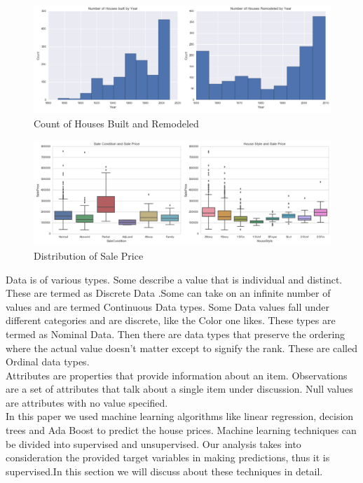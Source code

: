 \documentclass[fleqn,10pt]{SelfArx} %
\begin{document}
	\begin{figure}[ht]\centering %
		\includegraphics[width=\linewidth]{year}
		\caption{Count of Houses Built and Remodeled}
		\label{fig:year}
	\end{figure}
	\begin{figure}[ht]\centering %
		\includegraphics[width=\linewidth]{SalePrice}
		\caption{Distribution of Sale Price}
		\label{fig:SalePrice}
	\end{figure}

	Data is of various types. Some describe a value that is individual and distinct. These are termed as Discrete Data .Some can take on an infinite number of values and are termed Continuous Data types.  Some Data values fall under different categories and are discrete, like the Color one likes. These types are termed as Nominal Data. Then there are data types that preserve the ordering where the actual value doesn't matter except to signify the rank. These are called Ordinal data types. \\
	
	Attributes are properties that provide information about an item. Observations are a set of attributes that talk about a single item under discussion. Null values are attributes with no value specified.\\
	
	In this paper we used machine learning algorithms like linear regression, decision trees and Ada Boost to predict the house prices. Machine learning techniques can be divided into supervised and unsupervised. Our analysis takes into consideration the provided target variables in making predictions, thus it is supervised.In this section we will discuss about these techniques in detail.
	
\end{document}
